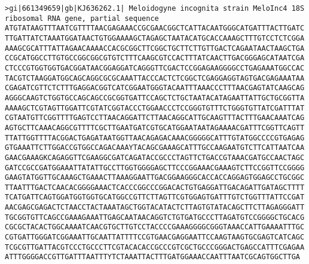 \documentclass[11pt]{article}
\begin{document}
\begin{Verbatim}[commandchars=\\\{\}]
>gi|661349659|gb|KJ636262.1| Meloidogyne incognita strain MeloInc4 18S ribosomal RNA gene, partial sequence
ATGTATAAGTTTAATCGTTTTAACGAGAAACCGCGAACGGCTCATTACAATGGGCATGATTTACTTGATC
TTGATTATCTAAATGGATAACTGTGGAAAAGCTAGAGCTAATACATGCACCAAAGCTTTGTCCTCTCGGA
AAAGCGCATTTATTAGAACAAAACCACGCGGCTTCGGCTGCTTCTTGTTGACTCAGAATAACTAAGCTGA
CCGCATGGCCTTGTGCCGGCGGCGTGTCTTTCAAGCGTCCACTTTATCAACTTGACGGGAGCATAATCGA
CTCCCGTGGTGGTGACGGATAACGGAGGATCAGGGTTCGACTCCGGAGAAGGGGCCTGAGAAATGGCCAC
TACGTCTAAGGATGGCAGCAGGCGCGCAAATTACCCACTCTCGGCTCGAGGAGGTAGTGACGAGAAATAA
CGAGATCGTTCTCTTTGAGGACGGTCATCGGAATGGGTACAATTTAAACCCTTTAACGAGTATCAAGCAG
AGGGCAAGTCTGGTGCCAGCAGCCGCGGTGATTCCAGCTCTGCTAATACATAGAATTATTGCTGCGGTTA
AAAAGCTCGTAGTTGGATTCGTATCGGTACCCTGGAACCCTCCGGGTGTTTCTGGGTGTTATCGATTTAT
CGTAATGTTCGGTTTTGAGTCCTTAACAGGATTCTTAACAGGCATTGCAAGTTTACTTTGAACAAATCAG
AGTGCTTCAAACAGGCGTTTTCGCTTGAATGATCGTGCATGGAATAATAGAAAACGATTTCGGTTCAGTT
TTATTGGTTTTACGGACTGAGATAATGGTTAACAGAGACAAACGGGGGCATTTGTATGGCCCCGTGAGAG
GTGAAATTCTTGGACCGTGGCCAGACAAAYTACAGCGAAAGCATTTGCCAAGAATGTCTTCATTAATCAA
GAACGAAAGKCAGAGGTTCGAAGGCGATCAGATACCGCCCTAGTTCTGACCGTAAACGATGCCAACTAGC
GATCCGCCGATGGAAATTATATTGCCTTGGTGGGGAGCTTCCCGGAAACGAAAGTCTTCCGGTTCCGGGG
GAAGTATGGTTGCAAAGCTGAAACTTAAAGGAATTGACGGAAGGGCACCACCAGGAGTGGAGCCTGCGGC
TTAATTTGACTCAACACGGGGAAACTCACCCGGCCCGGACACTGTGAGGATTGACAGATTGATAGCTTTT
TCATGATTCAGTGGATGGTGGTGCATGGCCGTTCTTAGTTCGTGGAGTGATTTGTCTGGTTTATTCCGAT
AACGAGCGAGACTCTAACCTACTAAATAGCTGGTACATACTCTTAGTGTATACAGCTTCTTAGAGGGATT
TGCGGTGTTCAGCCGAAAGAAATTGAGCAATAACAGGTCTGTGATGCCCTTAGATGTCCGGGGCTGCACG
CGCGCTACACTGGCAAAATCAACGTGCTTGTCCTACCCCGAAAGGGGCGGGTAAACCATTGAAAATTTGC
CGTGATTGGGATCGGAAATTGCAATTATTTTCCGTGAACGAGGAATTCCAAGTAAGTGCGAGTCATCAGC
TCGCGTTGATTACGTCCCTGCCCTTCGTACACACCGCCCGTCGCTGCCCGGGACTGAGCCATTTCGAGAA
ATTTGGGGACCGTTGATTTAATTTYTCTAAATTACTTTGATGGAAACCAATTTAATCGCAGTGGCTTGA


\end{Verbatim}
\end{document}
